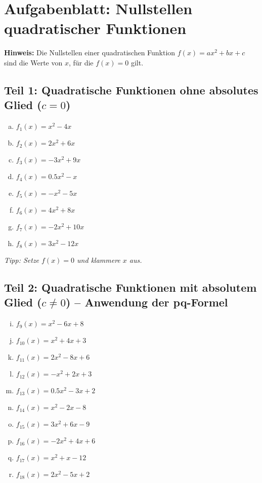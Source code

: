 

\section*{Aufgabenblatt: Nullstellen quadratischer Funktionen}

\textbf{Hinweis:} Die Nullstellen einer quadratischen Funktion $f(x) = ax^2 + bx + c$ sind die Werte von $x$, für die $f(x) = 0$ gilt.

\subsection*{Teil 1: Quadratische Funktionen ohne absolutes Glied ($c=0$)}
\begin{enumerate}[a)]
    \item $f_1(x) = x^2 - 4x$
    \item $f_2(x) = 2x^2 + 6x$
    \item $f_3(x) = -3x^2 + 9x$
    \item $f_4(x) = 0.5x^2 - x$
    \item $f_5(x) = -x^2 - 5x$
    \item $f_6(x) = 4x^2 + 8x$
    \item $f_7(x) = -2x^2 + 10x$
    \item $f_8(x) = 3x^2 - 12x$
\end{enumerate}

\textit{Tipp: Setze $f(x) = 0$ und klammere $x$ aus.}

\subsection*{Teil 2: Quadratische Funktionen mit absolutem Glied ($c \neq 0$) – Anwendung der pq-Formel}
\begin{enumerate}[a)]
    \setcounter{enumi}{8}
    \item $f_9(x) = x^2 - 6x + 8$
    \item $f_{10}(x) = x^2 + 4x + 3$
    \item $f_{11}(x) = 2x^2 - 8x + 6$
    \item $f_{12}(x) = -x^2 + 2x + 3$
    \item $f_{13}(x) = 0.5x^2 - 3x + 2$
    \item $f_{14}(x) = x^2 - 2x - 8$
    \item $f_{15}(x) = 3x^2 + 6x - 9$
    \item $f_{16}(x) = -2x^2 + 4x + 6$
    \item $f_{17}(x) = x^2 + x - 12$
    \item $f_{18}(x) = 2x^2 - 5x + 2$
\end{enumerate}


